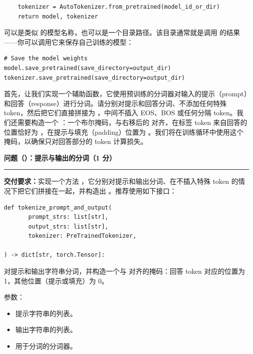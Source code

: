 \begin{lstlisting}
    tokenizer = AutoTokenizer.from_pretrained(model_id_or_dir)
    return model, tokenizer
\end{lstlisting}

 可以是类似  的模型名称，也可以是一个目录路径。该目录通常就是调用  的结果——你可以调用它来保存自己训练的模型：

\begin{lstlisting}
# Save the model weights
model.save_pretrained(save_directory=output_dir)
tokenizer.save_pretrained(save_directory=output_dir)
\end{lstlisting}

首先，让我们实现一个辅助函数，它使用预训练的分词器对输入的提示（prompt）和回答（response）进行分词。请分别对提示和回答分词、不添加任何特殊 token，然后把它们直接拼接为 ，中间不插入 EOS、BOS 或任何分隔 token。我们还需要构造一个 ：一个布尔掩码，与右移后的  对齐，在标签 token 来自回答的位置恰好为 ，在提示与填充（padding）位置为 。我们将在训练循环中使用这个掩码，以确保只对回答部分的 token 计算损失。

\medskip
\noindent\textbf{问题（）：提示与输出的分词（1 分）}
\par\nobreak\smallskip\hrule\nobreak\medskip

\textbf{交付要求：}实现一个方法 ，它分别对提示和输出分词、在不插入特殊 token 的情况下把它们拼接在一起，并构造出 。推荐使用如下接口：

\begin{lstlisting}
def tokenize_prompt_and_output(
       prompt_strs: list[str],
       output_strs: list[str],
       tokenizer: PreTrainedTokenizer,

) -> dict[str, torch.Tensor]:
\end{lstlisting}

对提示和输出字符串分词，并构造一个与  对齐的掩码：回答 token 对应的位置为 1，其他位置（提示或填充）为 0。

参数：

\begin{itemize}
  \item {} 提示字符串的列表。
  \item {} 输出字符串的列表。
  \item {} 用于分词的分词器。
\end{itemize}

